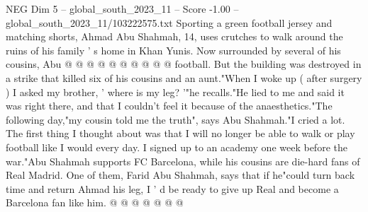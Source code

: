 \begin{textsample}{NEG Dim 5 – global\_south\_2023\_11 – Score -1.00 – global\_south\_2023\_11/103222575.txt}
Sporting a green football jersey and matching shorts, Ahmad Abu Shahmah, 14, uses crutches to walk around the ruins of his family ' s home in Khan Yunis.
Now surrounded by several of his cousins, Abu @ @ @ @ @ @ @ @ @ @ football.
But the building was destroyed in a strike that killed six of his cousins and an aunt."When I woke up ( after surgery ) I asked my brother, ' where is my leg? '"he recalls."He lied to me and said it was right there, and that I couldn't feel it because of the anaesthetics."The following day,"my cousin told me the truth", says Abu Shahmah."I cried a lot.
The first thing I thought about was that I will no longer be able to walk or play football like I would every day.
I signed up to an academy one week before the war."Abu Shahmah supports FC Barcelona, while his cousins are die-hard fans of Real Madrid.
One of them, Farid Abu Shahmah, says that if he"could turn back time and return Ahmad his leg, I ' d be ready to give up Real and become a Barcelona fan like him. @ @ @ @ @ @ @

\end{textsample}
